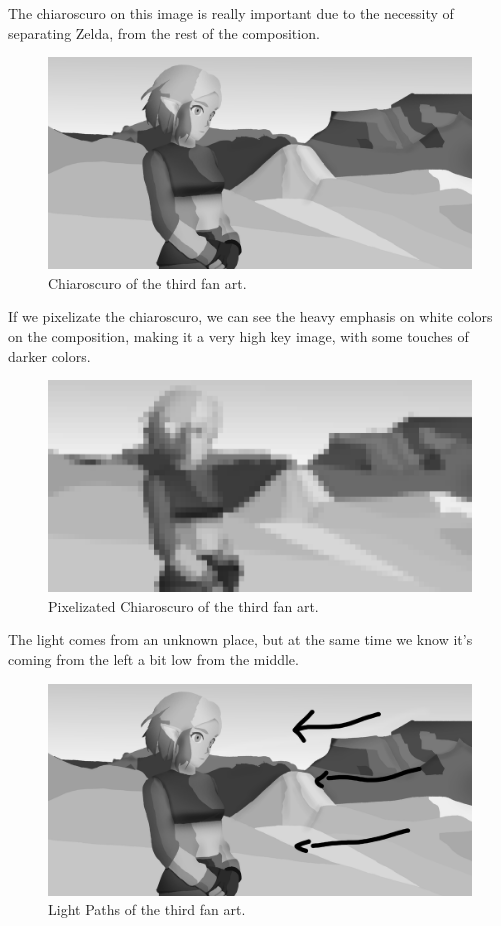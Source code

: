 \documentclass{cup-pan}
\begin{document}
            The chiaroscuro on this image is really important due to the necessity of separating Zelda, from the rest of the composition.
            \begin{figure}[H]
                \includegraphics[width=\textwidth]{Fanart3/0_Analisi/claroscuro.png}
                \caption{Chiaroscuro of the third fan art.}
            \end{figure}

            If we pixelizate the chiaroscuro, we can see the heavy emphasis on white colors on the composition, making it a very high key image, with some touches of darker colors. 
            \begin{figure}[H]
                \includegraphics[width=\textwidth]{Fanart3/0_Analisi/pixelize.png}
                \caption{Pixelizated Chiaroscuro of the third fan art.}
            \end{figure}

            The light comes from an unknown place, but at the same time we know it's coming from the left a bit low from the middle. 
            \begin{figure}[H]
                \includegraphics[width=\textwidth]{Fanart3/0_Analisi/light path.png}
                \caption{Light Paths of the third fan art.}
            \end{figure}
\end{document}

